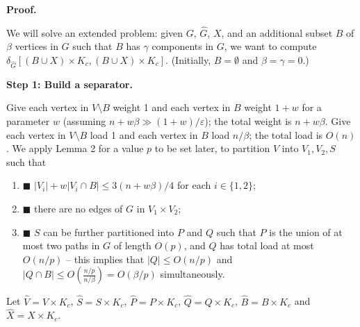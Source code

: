 \par
\par
\par
\par\medskip\noindent\textbf{Proof.}\par
We will solve an extended problem: given $G$, ${\widehat{G}}$, $X$, and an additional subset $B$ of $\beta$ vertices in $G$ such that $B$ has $\gamma$ components in $G$, we want to compute $\delta_{\widehat{G}}[(B\cup X)\times K_{c},(B\cup X)\times K_{c}]$. (Initially, $B=\emptyset$ and $\beta=\gamma=0$.)
\par
\par
\par\medskip\noindent\textbf{Step 1: Build a separator.}\par
Give each vertex in $V\setminus B$ weight 1 and each vertex in $B$ weight $1+w$ for a parameter $w$ (assuming $n+w\beta\gg(1+w)/\varepsilon$); the total weight is $n+w\beta$. Give each vertex in $V\setminus B$ load 1 and each vertex in $B$ load $n/\beta$; the total load is $O(n)$. We apply Lemma 2 for a value $p$ to be set later, to partition $V$ into $V_{1},V_{2},S$ such that
\par
\begin{enumerate}
\item[]  $\blacksquare$ 
$|V_{i}|+w|V_{i}\cap B|\leq 3(n+w\beta)/4$ for each $i\in\{1,2\}$;
\par
\par
\item[]  $\blacksquare$ 
there are no edges of $G$ in $V_{1}\times V_{2}$;
\par
\par
\item[]  $\blacksquare$ 
$S$ can be further partitioned into $P$ and $Q$ such that $P$ is the union of at most two paths in $G$ of length $O(p)$, and $Q$ has total load at most $O(n/p)$ – this implies that $|Q|\leq O(n/p)$ and $|Q\cap B|\leq O(\frac{n/p}{n/\beta})=O(\beta/p)$ simultaneously.
\par
\par
\end{enumerate}
Let $\widehat{V}=V\times K_{c}$, $\widehat{S}=S\times K_{c}$, $\widehat{P}=P\times K_{c}$, $\widehat{Q}=Q\times K_{c}$, $\widehat{B}=B\times K_{c}$ and $\widehat{X}=X\times K_{c}$.
\par
